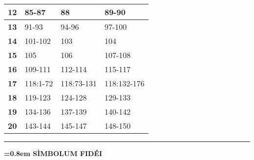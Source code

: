 \documentclass[twoside,11pt]{article}
\begin{document}
{{\begin{table}[ht]
\begin{tabular}{|cccc|}
    \multicolumn{1}{|c|}{\textbf{12}} & \multicolumn{1}{l|}{85-87} & \multicolumn{1}{l|}{88} & \multicolumn{1}{l|}{89-90} \\ \hline
    \multicolumn{1}{|c|}{\textbf{13}} & \multicolumn{1}{l|}{91-93} & \multicolumn{1}{l|}{94-96} & \multicolumn{1}{l|}{97-100} \\ \hline
    \multicolumn{1}{|c|}{\textbf{14}} & \multicolumn{1}{l|}{101-102} & \multicolumn{1}{l|}{103} & \multicolumn{1}{l|}{104} \\ \hline
    \multicolumn{1}{|c|}{\textbf{15}} & \multicolumn{1}{l|}{105} & \multicolumn{1}{l|}{106} & \multicolumn{1}{l|}{107-108} \\ \hline
    \multicolumn{1}{|c|}{\textbf{16}} & \multicolumn{1}{l|}{109-111} & \multicolumn{1}{l|}{112-114} & \multicolumn{1}{l|}{115-117} \\ \hline
    \multicolumn{1}{|c|}{\textbf{17}} & \multicolumn{1}{l|}{118:1-72} & \multicolumn{1}{l|}{118:73-131} & \multicolumn{1}{l|}{118:132-176} \\ \hline
    \multicolumn{1}{|c|}{\textbf{18}} & \multicolumn{1}{l|}{119-123} & \multicolumn{1}{l|}{124-128} & \multicolumn{1}{l|}{129-133} \\ \hline
    \multicolumn{1}{|c|}{\textbf{19}} & \multicolumn{1}{l|}{134-136} & \multicolumn{1}{l|}{137-139} & \multicolumn{1}{l|}{140-142} \\ \hline
    \multicolumn{1}{|c|}{\textbf{20}} & \multicolumn{1}{l|}{143-144} & \multicolumn{1}{l|}{145-147} & \multicolumn{1}{l|}{148-150} \\ \hline
    \end{tabular}
    \end{table}
  }
}

\newpage

\vspace*{0.75em}

{
  \begin{center}
  \rule{5em}{0.4pt}
  \end{center}
}

{
  \begin{center}
  {\bfseries{}\font=0.8em SÌMBOLUM FIDÉI}
  \end{center}
}
\end{document}
